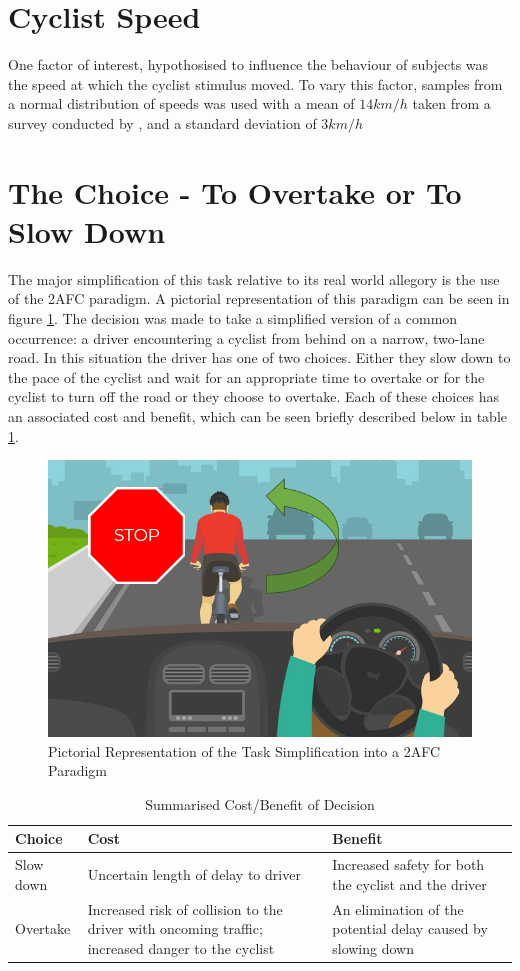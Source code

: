 \section{Cyclist Speed}
One factor of interest, hypothosised to influence the behaviour of subjects was the speed at which the cyclist stimulus moved. To vary this factor, samples from a normal distribution of speeds was used with a mean of $14 km/h$ taken from a survey conducted by \citet{gintyWhyCyclingRight2009}, and a standard deviation of $3 km/h$

\section{The Choice - To Overtake or To Slow Down}
The major simplification of this task relative to its real world allegory is the use of the 2AFC paradigm. A pictorial representation of this paradigm can be seen in figure \ref{fig:MET_2AFC}. The decision was made to take a simplified version of a common occurrence: a driver encountering a cyclist from behind on a narrow, two-lane road. In this situation the driver has one of two choices. Either they slow down to the pace of the cyclist and wait for an appropriate time to overtake or for the cyclist to turn off the road or they choose to overtake. Each of these choices has an associated cost and benefit, which can be seen briefly described below in table \ref{tab:CBA}.

\begin{figure}[H]
    \centering
    \includegraphics[width=0.45\linewidth]{figures/Methods_2AFC.png}
    \caption{Pictorial Representation of the Task Simplification into a 2AFC Paradigm}
    \label{fig:MET_2AFC}
\end{figure}

\begin{table}[H]
    \begin{center}
        \caption{Summarised Cost/Benefit of Decision}
        \label{tab:CBA}
        \resizebox{\textwidth}{!} {
        \begin{tabular}{p{}|p{}|p{}}\hline
            Choice      &   Cost  & Benefit \\\hline
            Slow down   &   Uncertain length of delay to driver  & Increased safety for both the cyclist and the driver  \\ \hline
            Overtake    &   Increased risk of collision to the driver with oncoming traffic; increased danger to the cyclist &  An elimination of the potential delay caused by slowing down  \\ \hline
        \end{tabular}}
    \end{center}
\end{table}

